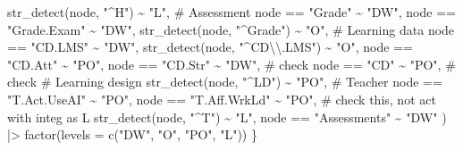 \documentclass[
  letterpaper,
  DIV=11,
  numbers=noendperiod]{scrartcl}
\newenvironment{Shaded}{\begin{snugshade}}{\end{snugshade}}
\newcommand{\AttributeTok}[1]{\textcolor[rgb]{0.40,0.45,0.13}{#1}}
\newcommand{\CommentTok}[1]{\textcolor[rgb]{0.37,0.37,0.37}{#1}}
\newcommand{\FunctionTok}[1]{\textcolor[rgb]{0.28,0.35,0.67}{#1}}
\newcommand{\NormalTok}[1]{\textcolor[rgb]{0.00,0.23,0.31}{#1}}
\newcommand{\SpecialCharTok}[1]{\textcolor[rgb]{0.37,0.37,0.37}{#1}}
\newcommand{\StringTok}[1]{\textcolor[rgb]{0.13,0.47,0.30}{#1}}
\begin{document}
\begin{Shaded}
\begin{Highlighting}[]
        \FunctionTok{str\_detect}\NormalTok{(node, }\StringTok{"\^{}H"}\NormalTok{) }\SpecialCharTok{\textasciitilde{}} \StringTok{"L"}\NormalTok{,}
        \CommentTok{\# Assessment}
\NormalTok{        node }\SpecialCharTok{==} \StringTok{"Grade"} \SpecialCharTok{\textasciitilde{}} \StringTok{"DW"}\NormalTok{,}
\NormalTok{        node }\SpecialCharTok{==} \StringTok{"Grade.Exam"} \SpecialCharTok{\textasciitilde{}} \StringTok{"DW"}\NormalTok{,}
        \FunctionTok{str\_detect}\NormalTok{(node, }\StringTok{"\^{}Grade"}\NormalTok{) }\SpecialCharTok{\textasciitilde{}} \StringTok{"O"}\NormalTok{,}
        \CommentTok{\# Learning data}
\NormalTok{        node }\SpecialCharTok{==} \StringTok{"CD.LMS"} \SpecialCharTok{\textasciitilde{}} \StringTok{"DW"}\NormalTok{,}
        \FunctionTok{str\_detect}\NormalTok{(node, }\StringTok{"\^{}CD}\SpecialCharTok{\textbackslash{}\textbackslash{}}\StringTok{.LMS"}\NormalTok{) }\SpecialCharTok{\textasciitilde{}} \StringTok{"O"}\NormalTok{,}
\NormalTok{        node }\SpecialCharTok{==} \StringTok{"CD.Att"} \SpecialCharTok{\textasciitilde{}} \StringTok{"PO"}\NormalTok{,}
\NormalTok{        node }\SpecialCharTok{==} \StringTok{"CD.Str"} \SpecialCharTok{\textasciitilde{}} \StringTok{"DW"}\NormalTok{, }\CommentTok{\# check}
\NormalTok{        node }\SpecialCharTok{==} \StringTok{"CD"} \SpecialCharTok{\textasciitilde{}} \StringTok{"PO"}\NormalTok{, }\CommentTok{\# check}
        \CommentTok{\# Learning design}
        \FunctionTok{str\_detect}\NormalTok{(node, }\StringTok{"\^{}LD"}\NormalTok{) }\SpecialCharTok{\textasciitilde{}} \StringTok{"PO"}\NormalTok{,}
        \CommentTok{\# Teacher}
\NormalTok{        node }\SpecialCharTok{==} \StringTok{"T.Act.UseAI"} \SpecialCharTok{\textasciitilde{}} \StringTok{"PO"}\NormalTok{,}
\NormalTok{        node }\SpecialCharTok{==} \StringTok{"T.Aff.WrkLd"} \SpecialCharTok{\textasciitilde{}} \StringTok{"PO"}\NormalTok{, }\CommentTok{\# check this, not act with integ as L}
        \FunctionTok{str\_detect}\NormalTok{(node, }\StringTok{"\^{}T"}\NormalTok{) }\SpecialCharTok{\textasciitilde{}} \StringTok{"L"}\NormalTok{,}
\NormalTok{        node }\SpecialCharTok{==} \StringTok{"Assessments"} \SpecialCharTok{\textasciitilde{}} \StringTok{"DW"}
\NormalTok{    ) }\SpecialCharTok{|\textgreater{}} 
        \FunctionTok{factor}\NormalTok{(}\AttributeTok{levels =} \FunctionTok{c}\NormalTok{(}\StringTok{"DW"}\NormalTok{, }\StringTok{"O"}\NormalTok{, }\StringTok{"PO"}\NormalTok{, }\StringTok{"L"}\NormalTok{))}
\NormalTok{\}}
\end{Highlighting}
\end{Shaded}
\end{document}

